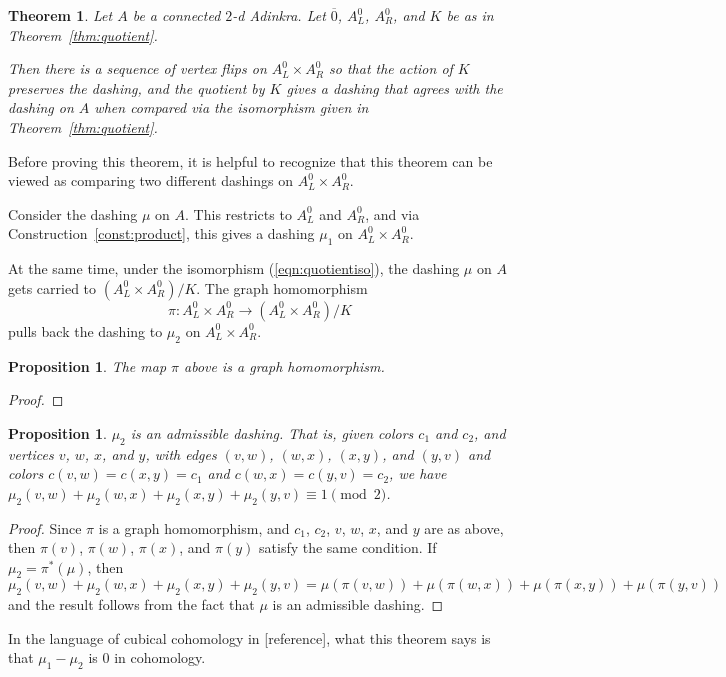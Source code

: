 \documentclass[12pt,twoside,singlespace]{article}
\numberwithin{equation}{section}
\newtheorem{thm}[equation]{Theorem}
\newtheorem{prop}[equation]{Proposition}
\theoremstyle{definition}
\begin{document}
\begin{thm}
Let $A$ be a connected $2$-d Adinkra.  Let $\overline{0}$, $A_L^0$, $A_R^0$, and $K$ be as in Theorem~\ref{thm:quotient}.

Then there is a sequence of vertex flips on $A_L^0\times A_R^0$ so that the action of $K$ preserves the dashing, and the quotient by $K$ gives a dashing that agrees with the dashing on $A$ when compared via the isomorphism given in Theorem~\ref{thm:quotient}.
\end{thm}

Before proving this theorem, it is helpful to recognize that this theorem can be viewed as comparing two different dashings on $A_L^0\times A_R^0$.

Consider the dashing $\mu$ on $A$.  This restricts to $A_L^0$ and $A_R^0$, and via Construction~\ref{const:product}, this gives a dashing $\mu_1$ on $A_L^0\times A_R^0$.




At the same time, under the isomorphism (\ref{eqn:quotientiso}), the dashing $\mu$ on $A$ gets carried to $(A_L^0\times A_R^0)/K$.  The graph homomorphism
\[\pi:A_L^0\times A_R^0\to (A_L^0\times A_R^0)/K\]
pulls back the dashing to $\mu_2$ on $A_L^0\times A_R^0$.

\begin{prop}
The map $\pi$ above is a graph homomorphism.
\end{prop}
\begin{proof}

\end{proof}

\begin{prop}
$\mu_2$ is an admissible dashing.  That is, given colors $c_1$ and $c_2$, and vertices $v$, $w$, $x$, and $y$, with edges $(v,w)$, $(w,x)$, $(x,y)$, and $(y,v)$ and colors $c(v,w)=c(x,y)=c_1$ and $c(w,x)=c(y,v)=c_2$, we have $\mu_2(v,w)+\mu_2(w,x)+\mu_2(x,y)+\mu_2(y,v)\equiv 1 \pmod{2}$.
\end{prop}
\begin{proof}
Since $\pi$ is a graph homomorphism, and $c_1$, $c_2$, $v$, $w$, $x$, and $y$ are as above, then $\pi(v)$, $\pi(w)$, $\pi(x)$, and $\pi(y)$ satisfy the same condition.  If $\mu_2=\pi^*(\mu)$, then $\mu_2(v,w)+\mu_2(w,x)+\mu_2(x,y)+\mu_2(y,v)=\mu(\pi(v,w))+\mu(\pi(w,x))+\mu(\pi(x,y))+\mu(\pi(y,v))$ and the result follows from the fact that $\mu$ is an admissible dashing.
\end{proof}

In the language of cubical cohomology in [reference], what this theorem says is that $\mu_1-\mu_2$ is 0 in cohomology.
\end{document}
